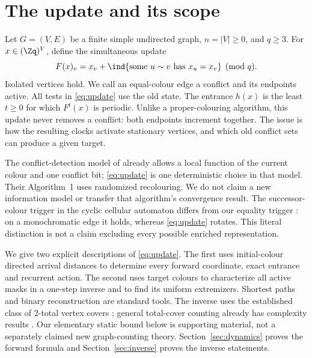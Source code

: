 \section{The update and its scope}
Let $G=(V,E)$ be a finite simple undirected graph, $n=|V|\ge0$, and
$q\ge3$. For $x\in(\Zq)^V$, define the simultaneous update
\begin{equation}\label{eq:update}
 F(x)_v=x_v+\ind\{\text{some }u\sim v\text{ has }x_u=x_v\}\pmod q.
\end{equation}
Isolated vertices hold. We call an equal-colour edge a conflict and its
endpoints active. All tests in \eqref{eq:update} use the old state.
The entrance $h(x)$ is the least $t\ge0$ for which $F^t(x)$ is periodic.
Unlike a proper-colouring algorithm, this update never removes a conflict:
both endpoints increment together. The issue is how the resulting clocks
activate stationary vertices, and which old conflict sets can produce a
given target.

The conflict-detection model of \citet[Section II-A]{motskin2009lightweight}
already allows a local function of the current colour and one conflict bit;
\eqref{eq:update} is one deterministic choice in that model. Their
Algorithm~1 uses randomized recolouring. We do not claim a new information
model or transfer that algorithm's convergence result. The successor-colour
trigger in the cyclic cellular automaton differs from our equality trigger
\citep[Section 1]{gravner2018limiting}: on a monochromatic edge it holds,
whereas \eqref{eq:update} rotates. This literal distinction is not a claim
excluding every possible enriched representation.

We give two explicit descriptions of \eqref{eq:update}. The first uses
initial-colour directed arrival distances to determine every forward
coordinate, exact entrance and recurrent action. The second uses target
colours to characterize all active masks in a one-step inverse and to find
its uniform extremizers. Shortest paths and binary reconstruction are
standard tools. The inverse uses the established class of $2$-total vertex
covers \citep{fernau2015cover}; general total-cover counting already has
complexity results \citep[Corollary 2.5]{molinero2018satisfaction}.
Our elementary static bound below is supporting material, not a separately
claimed new graph-counting theory. Section~\ref{sec:dynamics} proves the
forward formula and Section~\ref{sec:inverse} proves the inverse statements.
